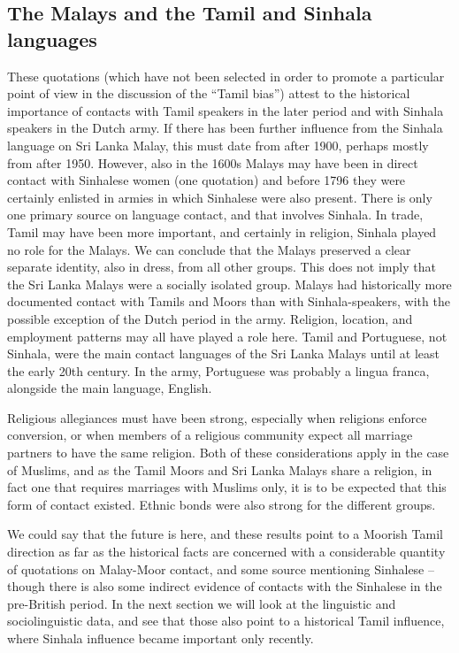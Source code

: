 \subsection{The Malays and the Tamil and Sinhala languages}%
These quotations (which have not been selected in order to promote a particular point of view in the discussion of the ``Tamil bias'') attest to the historical importance of contacts with Tamil speakers in the later period and with Sinhala speakers in the Dutch army. If there has been  further influence from the Sinhala language on Sri Lanka Malay, this must date from after 1900, perhaps mostly from after 1950. However, also in the 1600s Malays may have been in direct contact with Sinhalese women (one quotation) and before 1796 they were certainly enlisted in armies in which Sinhalese were also present. There is only one primary source on language contact, and that involves Sinhala. In trade, Tamil may have been more important, and certainly in religion, Sinhala played no role for the Malays.
We can conclude that the Malays preserved a clear separate identity, also in dress, from all other groups. This does not imply that the Sri Lanka Malays were a socially isolated group. Malays had historically more documented contact with Tamils and Moors than with Sinhala-speakers, with the possible exception of the Dutch period in the army. Religion, location, and employment patterns may all have played a role here. Tamil and Portuguese, not Sinhala, were the main contact languages of the Sri Lanka Malays until at least the early 20th century. In the army, Portuguese was probably a lingua franca, alongside the main language, English.

Religious allegiances must have been strong, especially when religions enforce conversion, or when members of a religious community expect all marriage partners to have the same religion. Both of these considerations apply in the case of Muslims, and as the Tamil Moors and Sri Lanka Malays share a religion, in fact one that requires marriages with Muslims only, it is to be expected that this form of contact existed. Ethnic bonds were also strong for the different groups.


We could say that the future is here, and these results point to a Moorish Tamil direction as far as the historical facts are concerned with a considerable quantity of quotations on Malay-Moor contact, and some source mentioning Sinhalese -- though there is also some indirect evidence of contacts with the Sinhalese in the pre-British period. In the next section we will look at the linguistic and sociolinguistic data, and see that those also point to a historical Tamil influence, where Sinhala influence became important only recently.

